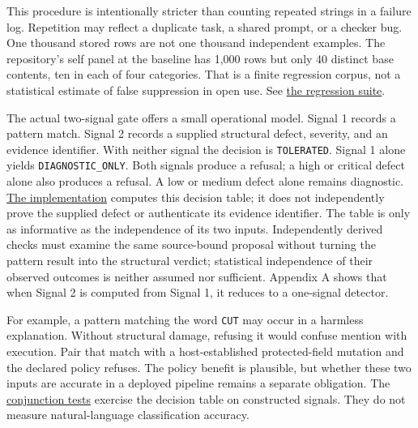 \documentclass[
  11pt,
]{article}
\newcommand{\passthrough}[1]{#1}
\begin{document}
This procedure is intentionally stricter than counting repeated strings
in a failure log. Repetition may reflect a duplicate task, a shared
prompt, or a checker bug. One thousand stored rows are not one thousand
independent examples. The repository's self panel at the baseline has
1,000 rows but only 40 distinct base contents, ten in each of four
categories. That is a finite regression corpus, not a statistical
estimate of false suppression in open use. See
\href{https://github.com/dbccpage/the_symbol_game/blob/52cb5457f6c485ba548cfd292f6012a941ed22cf/omega_engine_symbol_game/tests/test_immune_defect_regressions.py}{the
regression suite}.

The actual two-signal gate offers a small operational model. Signal 1
records a pattern match. Signal 2 records a supplied structural defect,
severity, and an evidence identifier. With neither signal the decision
is \passthrough{\lstinline!TOLERATED!}. Signal 1 alone yields
\texttt{\nolinkurl{DIAGNOSTIC_ONLY}}. Both signals produce a
refusal; a high or critical defect alone also produces a refusal. A low
or medium defect alone remains diagnostic.
\href{https://github.com/dbccpage/the_symbol_game/blob/52cb5457f6c485ba548cfd292f6012a941ed22cf/omega_engine_symbol_game/domain/immune/danger_gate.py}{The
implementation} computes this decision table; it does not independently
prove the supplied defect or authenticate its evidence identifier. The
table is only as informative as the independence of its two inputs.
Independently derived checks must examine the same source-bound proposal
without turning the pattern result into the structural verdict;
statistical independence of their observed outcomes is neither assumed
nor sufficient. Appendix A shows that when Signal 2 is computed from
Signal 1, it reduces to a one-signal detector.

For example, a pattern matching the word \passthrough{\lstinline!CUT!}
may occur in a harmless explanation. Without structural damage, refusing
it would confuse mention with execution. Pair that match with a
host-established protected-field mutation and the declared policy
refuses. The policy benefit is plausible, but whether these two inputs
are accurate in a deployed pipeline remains a separate obligation. The
\href{https://github.com/dbccpage/the_symbol_game/blob/52cb5457f6c485ba548cfd292f6012a941ed22cf/omega_engine_symbol_game/tests/mssn_sn_demos/test_demo_immune_soviet.py}{conjunction
tests} exercise the decision table on constructed signals. They do not
measure natural-language classification accuracy.
\end{document}
